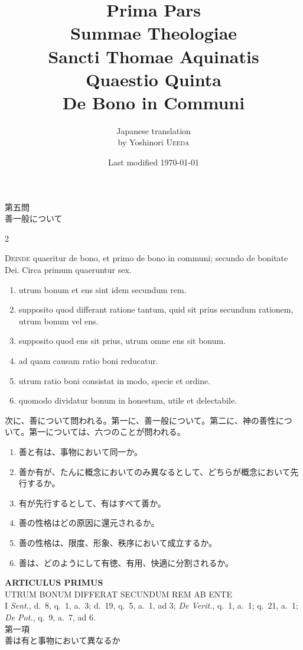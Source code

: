 \documentclass[paper=a4paper,fontsize=10pt,jafontsize=9pt,titlepage]{jlreq}
\title{{\bfseries Prima Pars}\\{\Huge Summae Theologiae}\\Sancti Thomae
Aquinatis\\Quaestio Quinta\\{\bfseries De Bono in Communi}}
\author{Japanese translation\\by Yoshinori {\scshape Ueeda}}
\date{Last modified \today}
\begin{document}
\maketitle
\begin{center}
 {\Large 第五問\\善一般について}
\end{center}
\begin{paracol}{2}

{\scshape Deinde} quaeritur de bono, et primo de bono in communi;
 secundo de bonitate Dei. Circa primum quaeruntur sex. 
\begin{enumerate}
 \item utrum
 bonum et ens sint idem secundum rem.
 \item supposito quod differant
 ratione tantum, quid sit prius secundum rationem, utrum bonum vel
 ens.
 \item supposito quod ens sit prius, utrum omne ens sit
 bonum.
 \item ad quam causam ratio boni reducatur. 
 \item utrum ratio
 boni consistat in modo, specie et ordine.
 \item quomodo dividatur
 bonum in honestum, utile et delectabile.
\end{enumerate}

\switchcolumn

次に、善について問われる。第一に、善一般について。第二に、神の善性につ
いて。第一については、六つのことが問われる。

\begin{enumerate}
 \item 善と有は、事物において同一か。
 \item 善か有が、たんに概念においてのみ異なるとして、どちらが概念において先行するか。       
 \item 有が先行するとして、有はすべて善か。
 \item 善の性格はどの原因に還元されるか。
 \item 善の性格は、限度、形象、秩序において成立するか。
 \item 善は、どのようにして有徳、有用、快適に分割されるか。
\end{enumerate}

\end{paracol}

\newpage
{}
{}
\setcounter{section}{1}
\setcounter{subsection}{0}

\begin{center}
 {\Large {\bfseries ARTICULUS PRIMUS}}\\
 {\large UTRUM BONUM DIFFERAT SECUNDUM REM AB ENTE}\\
 {\footnotesize I {\itshape Sent.}, d.~8, q.~1, a.~3; d.~19, q.~5, a.~1,
 ad 3; {\itshape De Verit.}, q.~1, a.~1; q.~21, a.~1; {\itshape De
 Pot.}, q.~9, a.~7, ad 6.}\\
 {\Large 第一項\\善は有と事物において異なるか}
\end{center}
\end{document}
